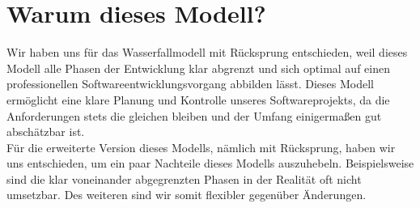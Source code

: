 \section{Warum dieses Modell?}
Wir haben uns für das Wasserfallmodell mit Rücksprung entschieden, weil dieses Modell alle Phasen der Entwicklung klar abgrenzt und sich optimal auf einen professionellen Softwareentwicklungsvorgang abbilden lässt.
Dieses Modell ermöglicht eine klare Planung und Kontrolle unseres Softwareprojekts, da die Anforderungen stets die gleichen bleiben und der Umfang einigermaßen gut abschätzbar ist.\\

Für die erweiterte Version dieses Modells, nämlich mit Rücksprung, haben wir uns entschieden, um ein paar Nachteile dieses Modells auszuhebeln. Beispielsweise sind die klar voneinander abgegrenzten Phasen in der Realität oft nicht umsetzbar. Des weiteren sind wir somit flexibler gegenüber Änderungen.
